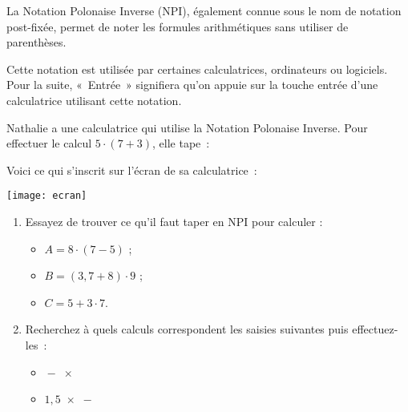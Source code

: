 \begin{TP}

La Notation Polonaise Inverse (NPI), également connue sous le nom de notation post-fixée, permet de noter les formules arithmétiques sans utiliser de parenthèses.

Cette notation est utilisée par certaines calculatrices, ordinateurs ou logiciels. Pour la suite, « Entrée » signifiera qu'on appuie sur la touche entrée d'une calculatrice utilisant cette notation.


Nathalie a une calculatrice qui utilise la Notation Polonaise Inverse. Pour effectuer le calcul $5 \cdot (7 + 3)$, elle tape : \\[-1em]
\begin{center} \boxed{\textcolor{C2}{7}} \quad \boxed{\text{\textcolor{C2}{Entrée}}} \quad \boxed{\textcolor{H1}{3}} \quad \boxed{\text{\textcolor{H1}{Entrée}}} \quad \boxed{\textcolor{BleuOuv}{+}} \quad \boxed{\textcolor{J1}{5}} \quad \boxed{\text{\textcolor{J1}{Entrée}}} \quad \boxed{\times} \end{center}

\vspace{1em}

Voici ce qui s'inscrit sur l'écran de sa calculatrice :\\[1em]
\begin{center} \texttt{[image: ecran]} \end{center}

\begin{enumerate}
 \item Essayez de trouver ce qu'il faut taper en NPI pour calculer :
 \begin{itemize}
  \item $A = 8 \cdot (7 - 5)$ ;
  \item $B = (3,7 + 8) \cdot 9$ ;
  \item $C = 5 + 3 \cdot 7$.
  \end{itemize}
  
 \item Recherchez à quels calculs correspondent les saisies suivantes puis effectuez-les :
  \begin{itemize} 
  
  \vspace{1em}
  
  \item {} \quad {} \quad {} \quad {} \quad $\boxed{-}$ \quad {} \quad {} \quad $\boxed{\times}$ \\[-0.75em]
  \item {} \quad {} \quad {} \quad {} \quad $\boxed{1,5}$ \quad {} \quad $\boxed{\times}$ \quad $\boxed{-}$
  \end{itemize}
\end{enumerate}



\end{TP}
